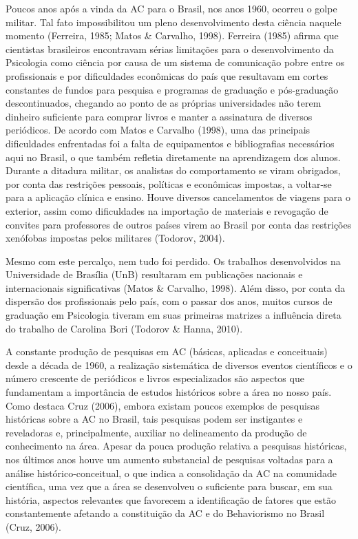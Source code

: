 Poucos anos após a vinda da AC para o Brasil, nos anos 1960, ocorreu o golpe militar. Tal fato impossibilitou um pleno desenvolvimento desta ciência naquele momento (Ferreira, 1985; Matos \& Carvalho, 1998). Ferreira (1985) afirma que cientistas brasileiros encontravam sérias limitações para o desenvolvimento da Psicologia como ciência por causa de um sistema de comunicação pobre entre os profissionais e por dificuldades econômicas do país que resultavam em cortes constantes de fundos para pesquisa e programas de graduação e pós-graduação descontinuados, chegando ao ponto de as próprias universidades não terem dinheiro suficiente para comprar livros e manter a assinatura de diversos periódicos. De acordo com Matos e Carvalho (1998), uma das principais dificuldades enfrentadas foi a falta de equipamentos e bibliografias necessários aqui no Brasil, o que também refletia diretamente na aprendizagem dos alunos. Durante a ditadura militar, os analistas do comportamento se viram obrigados, por conta das restrições pessoais, políticas e econômicas impostas, a voltar-se para a aplicação clínica e ensino. Houve diversos cancelamentos de viagens para o exterior, assim como dificuldades na importação de materiais e revogação de convites para professores de outros países virem ao Brasil por conta das restrições xenófobas impostas pelos militares (Todorov, 2004). 

Mesmo com este percalço, nem tudo foi perdido. Os trabalhos desenvolvidos na Universidade de Brasília (UnB) resultaram em publicações nacionais e internacionais significativas (Matos \& Carvalho, 1998). Além disso, por conta da dispersão dos profissionais pelo país, com o passar dos anos, muitos cursos de graduação em Psicologia tiveram em suas primeiras matrizes a influência direta do trabalho de Carolina Bori (Todorov \& Hanna, 2010).

A constante produção de pesquisas em AC (básicas, aplicadas e conceituais) desde a década de 1960, a realização sistemática de diversos eventos científicos e o número crescente de periódicos e livros especializados são aspectos que fundamentam a importância de estudos históricos sobre a área no nosso país. Como destaca Cruz (2006), embora existam poucos exemplos de pesquisas históricas sobre a AC no Brasil, tais pesquisas podem ser instigantes e reveladoras e, principalmente, auxiliar no delineamento da produção de conhecimento na área. Apesar da pouca produção relativa a pesquisas históricas, nos últimos anos houve um aumento substancial de pesquisas voltadas para a análise histórico-conceitual, o que indica a consolidação da AC na comunidade científica, uma vez que a área se desenvolveu o suficiente para buscar, em sua história, aspectos relevantes que favorecem a identificação de fatores que estão constantemente afetando a constituição da AC e do Behaviorismo no Brasil (Cruz, 2006). 

